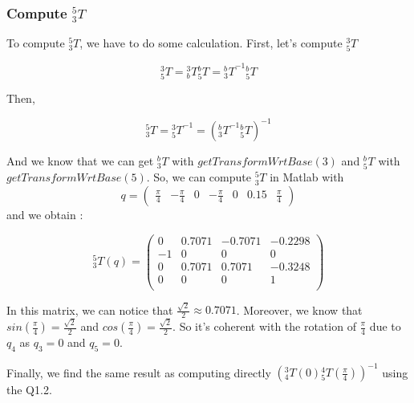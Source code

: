 \subsubsection{Compute $^5_3 T$}

To compute $^5_3 T$, we have to do some calculation. 
First, let's compute $^3_5 T$

\[ ^3_5 T = {^3_b T}  {^b_5 T} = {^b_3 T}^{-1} {^b_5 T}  \]

Then, 

\[ ^5_3 T = {^3_5 T}^{-1} = {({^b_3 T}^{-1} {^b_5 T})}^{-1} \]

And we know that we can get $^b_3 T$ with $getTransformWrtBase(3)$ and $^b_5 T$ with $getTransformWrtBase(5)$. So, we can compute $^5_3 T$ in Matlab with \[
q = \begin{pmatrix}
    \frac{\pi}{4} & -\frac{\pi}{4} & 0 & -\frac{\pi}{4} & 0 & 0.15 & \frac{\pi}{4}
\end{pmatrix}
\] and we obtain :

\[^5_3 T(q) = \begin{pmatrix}
        0 & 0.7071 & -0.7071 & -0.2298 \\
        -1 & 0 & 0 & 0 \\
        0 & 0.7071 & 0.7071 & -0.3248 \\
        0 & 0 & 0 & 1 \\
    \end{pmatrix}\]


In this matrix, we can notice that $\frac{\sqrt{2}}{2} \approx 0.7071$. Moreover, we know that $sin(\frac{\pi}{4}) = \frac{\sqrt{2}}{2} $ and $cos(\frac{\pi}{4}) = \frac{\sqrt{2}}{2} $. So it's coherent with the rotation of $\frac{\pi}{4}$ due to $q_4$ as $q_3=0$ and $q_5=0$.

Finally, we find the same result as computing directly ${({^3_4 T(0)} {^4_5 T(\frac{\pi}{4})})}^{-1}$ using the Q1.2.

\newpage